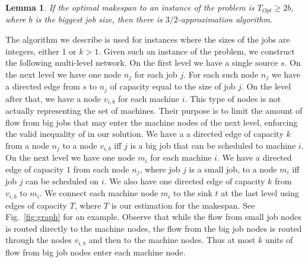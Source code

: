 \documentclass[11pt]{article}\usepackage{amsmath}
\newtheorem{lemma}{Lemma}[section]
\newenvironment{proof}{\noindent{\bf Proof.}}{  \rule{2mm}{3mm}}
\begin{document}
\begin{lemma} \cite{lenstra} \label{lemma:add}
If the optimal makespan to an instance of the problem is $T_ {Opt} \geq 2b$, where $b$ is the biggest job size, then there is $3/2$-approximation algorithm. 
\end{lemma}
\iffalse =========================
\begin{proof}
The rounding algorithm of \cite{lenstra} returns a solution with makespan at most $T_ {Opt}+b$. This is clearly a $3/2$ approximate solution.
\end{proof}
====================== \fi 

The algorithm we describe is used for instances where the sizes of the jobs are integers, either 1 or $k>1$.
Given  such an  instance  of   the  problem,  we  construct  the  following
multi-level  network. On  the  first  level we  have  a single  source
$s$. On the  next level we have one node $n_j$ for each  job $j$. For
each such  node $n_j$  we have a  directed edge  from $s$ to  $n_j$ of
capacity equal  to the size  of job $j$.  On the level after  that, we
have a node $v_{i,b}$ for each  machine $i.$ This type of nodes is not
actually representing the  set of machines. Their purpose  is to limit
the amount of flow from big jobs that may enter the machine nodes of
the next level, enforcing  the valid inequality of \cite{ebenlendr} in
our solution.  
We have a a directed  edge of capacity $k$  from a node
$n_{j}$ to a node  $v_{i,b}$ iff $j$ is a big job that can be scheduled
to machine  $i$. On  the next level  we have  one node $m_i$  for each
machine $i$.  We have a directed  edge of capacity $1$  from each node
$n_{j}$, where job $j$  is a small job, to a node  $m_i$ iff job $j$ can
be scheduled  on $i$. We also  have one directed edge  of capacity $k$
from $v_{i,b}$  to $m_i$.  We connect each  machine node $m_i$  to the
sink $t$ at  the last level using edges of capacity  $T$, where $T$ is
our  estimation for  the makespan.  See Fig.~\ref{fig:graph} 
for an example. Observe that  while the  flow from
small job nodes is routed directly to the machine nodes, the flow from
the big  job nodes is routed  through the nodes $v_{i,b}$  and then to
the machine nodes.  Thus at most $k$ units of flow  from big job nodes
enter each machine node.
\end{document}
